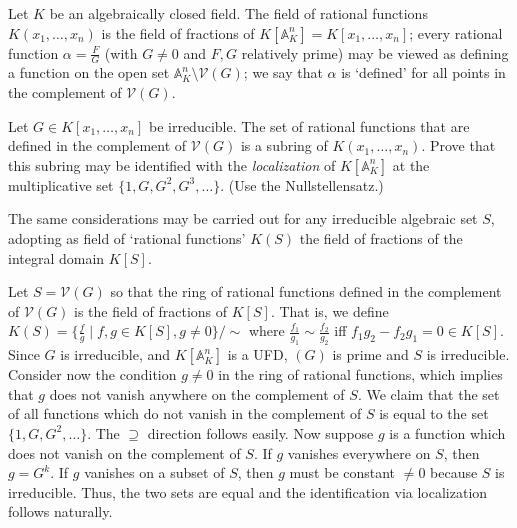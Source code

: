 \documentclass[../../master.tex]{subfiles}
\begin{document}
\begin{problem}
    Let $K$ be an algebraically closed field.
    The field of rational functions $K(x_1, \ldots, x_n)$ is the field of fractions of $K[\mathbb{A}^{n}_K] = K[x_1, \ldots, x_n]$;
    every rational function $\alpha = \frac{F}{G}$ (with $G \neq 0$ and $F, G$ relatively prime) may be viewed as defining a function on the open set $\mathbb{A}^{n}_K \setminus \mathscr{V}(G)$;
    we say that $\alpha$ is `defined' for all points in the complement of $\mathscr{V}(G)$.

    Let $G \in K[x_1, \ldots, x_n]$ be irreducible.
    The set of rational functions that are defined in the complement of $\mathscr{V}(G)$ is a subring of $K(x_1, \ldots, x_n)$.
    Prove that this subring may be identified with the \textit{localization} of $K[\mathbb{A}^{n}_K]$ at the multiplicative set $\{1, G, G^2, G^3, \ldots\}$.
    (Use the Nullstellensatz.)

    The same considerations may be carried out for any irreducible algebraic set $S$, adopting as field of `rational functions' $K(S)$ the field of fractions of  the integral domain $K[S]$.
\end{problem}

\begin{solution}
    Let $S = \mathscr{V}(G)$ so that the ring of rational functions defined in the complement of $\mathscr{V}(G)$ is the field of fractions of $K[S]$.
    That is, we define $K(S) = \{\frac{f}{g} \mid f, g \in K[S], g \neq 0\} / \sim$ where $\frac{f_1}{g_1} \sim \frac{f_2}{g_2}$ iff $f_1 g_2 - f_2 g_1 = 0 \in K[S]$.
    Since $G$ is irreducible, and $K[\mathbb{A}^{n}_K]$ is a UFD, $(G)$ is prime and $S$ is irreducible.
    Consider now the condition $g \neq 0$ in the ring of rational functions, which implies that $g$ does not vanish anywhere on the complement of $S$.
    We claim that the set of all functions which do not vanish in the complement of $S$ is equal to the set $\{1, G, G^2, \ldots\}$.
    The $\supseteq$ direction follows easily.
    Now suppose $g$ is a function which does not vanish on the complement of $S$.
    If $g$ vanishes everywhere on $S$, then $g = G^{k}$.
    If $g$ vanishes on a subset of $S$, then $g$ must be constant $\neq 0$ because $S$ is irreducible.
    Thus, the two sets are equal and the identification via localization follows naturally.
\end{solution}
\end{document}
